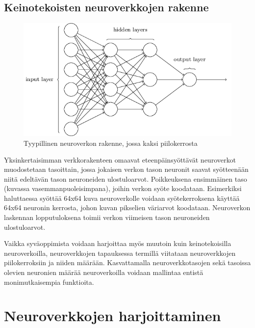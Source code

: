 \documentclass[finnish]{tktltiki2}
\theoremstyle{definition}
\theoremstyle{remark}
\begin{document}


  \subsection{Keinotekoisten neuroverkkojen rakenne}

  \begin{figure}[h]
  \centering
  \includegraphics[scale=0.5]{basic-neuralnet}
  \caption{Tyypillinen neuroverkon rakenne, jossa kaksi piilokerrosta \cite{Nielsen-neural}}
  \label{pic:neuralnet}
  \end{figure}

  Yksinkertaisimman verkkorakenteen omaavat eteenpäinsyöttävät neuroverkot muodostetaan tasoittain, jossa jokaisen verkon tason neuronit saavat syötteenään niitä edeltävän tason neuroneiden ulostuloarvot. Poikkeuksena ensimmäinen taso (kuvassa vasemmanpuoleisimpana), joihin verkon syöte koodataan. Esimerkiksi haluttaessa syöttää 64x64 kuva neuroverkolle voidaan syötekerroksena käyttää 64x64 neuronin kerrosta, johon kuvan pikselien väriarvot koodataan. Neuroverkon laskennan lopputuloksena toimii verkon viimeisen tason neuroneiden ulostuloarvot.

  Vaikka syväoppimista voidaan harjoittaa myös muutoin kuin keinotekoisilla neuroverkoilla, neuroverkkojen tapauksessa termillä viitataan neuroverkkojen piilokerroksiin ja niiden määrään. Kasvattamalla neuroverkkotasojen sekä tasoissa olevien neuronien määrää neuroverkoilla voidaan mallintaa entistä monimutkaisempia funktioita.

  \section{Neuroverkkojen harjoittaminen}
    \label{chap:neural-training}
\end{document}
